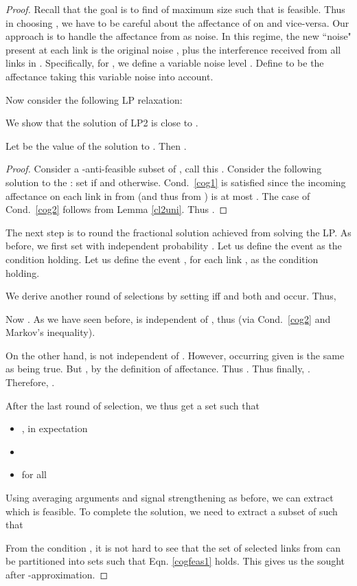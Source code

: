 \documentclass[11pt]{amsart}
\begin{document}
\begin{proof}
Recall that the goal is to find  of maximum size
such that  is feasible. Thus in choosing , we
have to be careful about the affectance of  on  and
vice-versa. Our approach is to handle the affectance from  as
noise. In this regime, the new ``noise" present at each link is the
original noise , plus the interference received from all links in
. Specifically, for ,
we define a variable noise level .  Define 
to be the affectance taking this variable noise into account.

Now consider the following LP relaxation:

We show that the solution of LP2 is close to .
\begin{lemma}
Let  be the value of the solution to . Then .
\end{lemma}
\begin{proof}
Consider a -anti-feasible subset of , call this .
Consider the following solution to the : set  if  and  otherwise.
Cond.\ \ref{cog1} is satisfied since the incoming affectance on 
each link in  from  (and thus from ) is at most . 
The case of Cond.\ \ref{cog2} follows from Lemma \ref{cl2uni}. Thus .
\end{proof}

The next step is to round the fractional solution achieved from solving the LP. As before, we first set  with independent probability .
Let us define the event  as the condition  holding. Let us define the event , for each link , as the condition  holding.

We derive another round of selections by setting   iff  and both  and  occur. Thus,
 



Now . As we have seen before,  is independent of , thus  (via  Cond.\ \ref{cog2} and Markov's inequality). 

On the other hand,  is not independent of . However,  occurring given  is the same as   being true. But , by the definition of affectance. Thus . Thus finally, . Therefore, .



After the last round of selection, we thus get a set  such that
\begin{itemize}
\item , in expectation
\item 
\item   for all 
\end{itemize}
Using averaging arguments and signal strengthening as before, we can extract  which is feasible.
To complete the solution, we need to extract a subset of  such that
 

From the condition , it is not hard to see that the set of
selected links from  can be partitioned into  sets such that Eqn. \ref{cogfeas1} holds. This
gives us the sought after -approximation.
\end{proof}
\end{document}

